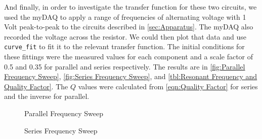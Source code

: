 \documentclass[12pt]{article}
\numberwithin{equation}{section}
\numberwithin{figure}{section}
\begin{document}
    And finally, in order to investigate the transfer function for these two circuits, we used the 
    myDAQ to apply a range of frequencies of alternating voltage with 1 Volt peak-to-peak to the 
    circuits described in \autoref{sec:Apparatus}. The myDAQ also recorded the voltage across the 
    resistor. We could then plot that data and use \texttt{curve\_fit} to fit it to the relevant 
    transfer function. The initial conditions for these fittings were the measured values for each 
    component and a scale factor of 0.5 and 0.35 for parallel and series respectively.
    The results are in \autoref{fig:Parallel Frequency Sweep}, 
    \autoref{fig:Series Frequency Sweep}, and \autoref{tbl:Resonant Frequency and Quality Factor}.
    The $Q$ values were calculated from \autoref{eqn:Quality Factor} for series and the inverse 
    for parallel.

    \begin{figure}[H]
        \begin{center}
           \caption{Parallel Frequency Sweep}
           \label{fig:Parallel Frequency Sweep}
        \end{center}
    \end{figure}
    \begin{figure}[H]
        \begin{center}
           \caption{Series Frequency Sweep}
           \label{fig:Series Frequency Sweep}
        \end{center}
    \end{figure}
\end{document}
